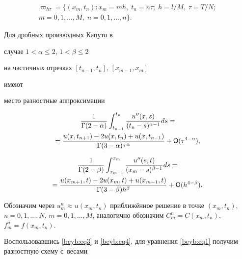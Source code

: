 \begin{multline}

\varpi_{h\tau } =\bigl\{ (x_m, t_n ) : x_m =mh, \; t_n =n\tau; \; h={l}/{M}, \; \tau ={T}/{N}; \\ 

m=0, 1, \ldots, M, \;  n=0, 1, \ldots, n\bigr\}.

\end{multline}









Для дробных производных Капуто  в

случае $1<\alpha \le 2$, $1<\beta \le 2$ 

на частичных отрезках $[t_{n-1}, t_n]$, $[x_{m-1}, x_m ] $

имеют

место разностные аппроксимации~\cite{beyb:bib4}

\begin{multline}

\label{beyb:eq3}

\frac{1}{\Gamma (2-\alpha)} \int _{t_{n-1}}^{t_n} \frac{u''(x,s)}{(t_n -s)^{\alpha-1}} ds

= \\ =

\frac{u(x, t_{n+1}) - 2u (x, t_n) +u (x, t_{n-1}) }{\Gamma(3-\alpha) \tau ^\alpha} +

{\sf O} (\tau^{4-\alpha}),

\end{multline}

\begin{multline}

\label{beyb:eq4}

\frac{1}{\Gamma (2-\beta)} \int _{x_{m-1}}^{x_m} \frac{u''(s,t)}{(x_m -s)^{\beta-1}} ds

= \\ =

\frac{u(x_{m+1}, t) - 2 u (x_m, t) + u(x_{m-1}, t)  }{\Gamma (3-\beta) h ^\beta} + {\sf O} (h^{4-\beta}).

\end{multline}



Обозначим через $u_m^n \approx u(x_m, t_n)$ приближённое решение в точке $(x_m,t_n)$, $n=0, 1, \ldots, N$, $m=0, 1, \ldots, M$, аналогично обозначим $C_m^n = C(x_m, t_n)$, $f_m^n = f(x_m, t_n)$.

Воспользовавшись \eqref{beyb:eq3} и \eqref{beyb:eq4}, для уравнения \eqref{beyb:eq1} получим разностную схему с~весами

